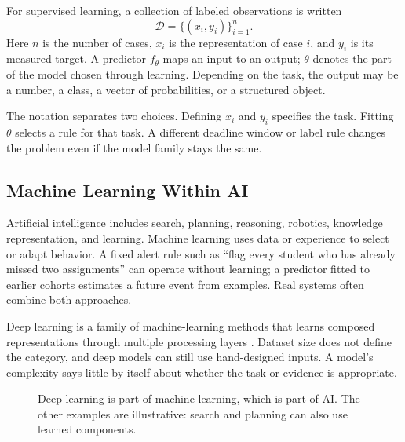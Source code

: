 For supervised learning, a collection of labeled observations is written
\[
\mathcal{D}=\{(x_i,y_i)\}_{i=1}^{n}.
\]
Here $n$ is the number of cases, $x_i$ is the representation of case $i$, and $y_i$ is its measured target. A predictor $f_\theta$ maps an input to an output; $\theta$ denotes the part of the model chosen through learning. Depending on the task, the output may be a number, a class, a vector of probabilities, or a structured object.

The notation separates two choices. Defining $x_i$ and $y_i$ specifies the task. Fitting $\theta$ selects a rule for that task. A different deadline window or label rule changes the problem even if the model family stays the same.

\subsection{Machine Learning Within AI}

Artificial intelligence includes search, planning, reasoning, robotics, knowledge representation, and learning. Machine learning uses data or experience to select or adapt behavior. A fixed alert rule such as ``flag every student who has already missed two assignments'' can operate without learning; a predictor fitted to earlier cohorts estimates a future event from examples. Real systems often combine both approaches.

Deep learning is a family of machine-learning methods that learns composed representations through multiple processing layers \citep{goodfellow2016}. Dataset size does not define the category, and deep models can still use hand-designed inputs. A model's complexity says little by itself about whether the task or evidence is appropriate.

\begin{figure}[t]
\centering
{}
\caption{Deep learning is part of machine learning, which is part of AI. The other examples are illustrative: search and planning can also use learned components.}
\label{fig:ai-ml-dl}
\end{figure}

